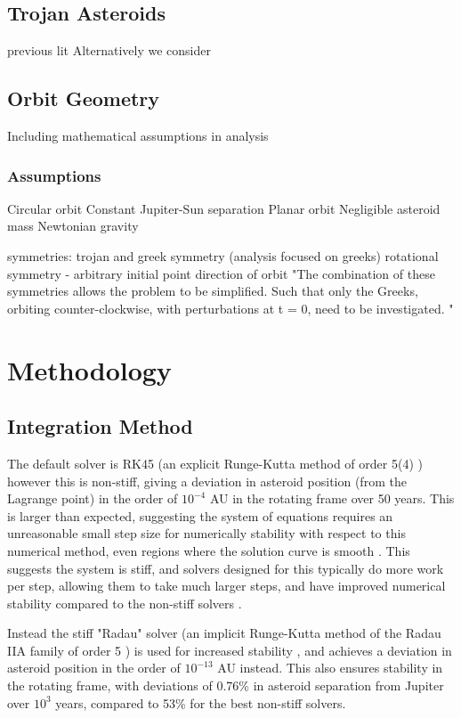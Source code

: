 \documentclass[11pt, a4paper,twocolumn]{article} %
\begin{document}
\subsection{Trojan Asteroids}
previous lit
Alternatively we consider \cite{Nakamura2008}

\subsection{Orbit Geometry}
Including mathematical assumptions in analysis

\subsubsection{Assumptions}
Circular orbit
Constant Jupiter-Sun separation
Planar orbit
Negligible asteroid mass
Newtonian gravity

symmetries:
trojan and greek symmetry (analysis focused on greeks)
rotational symmetry - arbitrary initial point 
direction of orbit
"The combination of these symmetries allows the problem to be simplified. Such that
only the Greeks, orbiting counter-clockwise, with perturbations at t = 0, need to be
investigated.
"

\section{Methodology}
\subsection{Integration Method}
The default solver is RK45 (an explicit Runge-Kutta method of order 5(4) \cite{Dormand1980}) however this is non-stiff, giving a deviation in asteroid position (from the Lagrange point) in the order of $ 10^{-4}$ AU in the rotating frame over 50 years. This is larger than expected, suggesting the system of equations requires an unreasonable small step size for  numerically stability with respect to this numerical method, even regions where the solution curve is smooth \cite{Lambert1991}. This suggests the system is stiff, and solvers designed for this typically do more work per step, allowing them to take much larger steps, and have improved numerical stability compared to the non-stiff solvers \cite{Byrne1987}. 

Instead the stiff "Radau" solver (an implicit Runge-Kutta method of the Radau IIA family of order 5 \cite{Hairer2010}) is used for increased stability \cite{Frank1985}, and achieves a deviation in asteroid position in the order of $ 10^{-13}$ AU instead. This also ensures stability in the rotating frame, with deviations of 0.76\% in asteroid separation from Jupiter over $ 10^{3} $ years, compared to 53\% for the best non-stiff solvers.
\end{document}

